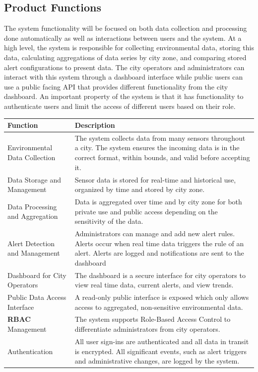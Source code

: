 \documentclass[]{article}
\begin{document}
\subsection{Product Functions}
\label{sub:product_functions}
The system functionality will be focused on both data collection and processing done 
automatically as well as interactions between users and the system. At a high level, the 
system is responsible for collecting environmental data, storing this data, calculating 
aggregations of data series by city zone, and comparing stored alert configurations to 
present data. The city operators and administrators can interact with this system through 
a dashboard interface while public users can use a public facing API that provides different 
functionality from the city dashboard. An important property of the system is that it has 
functionality to authenticate users and limit the access of different users based on their role. 

\begin{center}
\begin{tabular}{ |m{2in}|m{4.5in}| } 
 \hline
 \bf{Function} & \bf{Description} \\ 
 \hline
 Environmental Data Collection & The system collects data from many sensors throughout a city. The system ensures the incoming data is in the correct format, within bounds, and valid before accepting it. \\ 
 \hline
 Data Storage and Management & Sensor data is stored for real-time and historical use, organized by time and stored by city zone. \\ 
 \hline
 Data Processing and Aggregation & Data is aggregated over time and by city zone for both private use and public access depending on the sensitivity of the data.  \\ 
 \hline
 Alert Detection and Management & Administrators can manage and add new alert rules. Alerts occur when real time data triggers the rule of an alert. Alerts are logged and notifications are sent to the dashboard \\ 
 \hline
 Dashboard for City Operators & The dashboard is a secure interface for city operators to view real time data, current alerts, and view trends.  \\ 
 \hline
 Public Data Access Interface & A read-only public interface is exposed which only allows access to aggregated, non-sensitive environmental data. \\ 
 \hline
 \textbf{RBAC} Management & The system supports Role-Based Access Control to differentiate administrators from city operators.  \\ 
 \hline
 Authentication & All user sign-ins are authenticated and all data in transit is encrypted. All significant events, such as alert triggers and administrative changes, are logged by the system.  \\ 
 \hline
\end{tabular}
\end{center}
\end{document}

